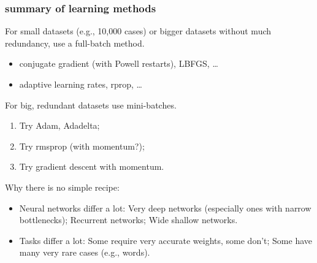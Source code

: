 \documentclass[USenglish,pdftex,compress,10pt,svgnamesi,handout]{beamer}
\begin{document}
\begin{frame}
\frametitle{summary of learning methods}
For small datasets (e.g., 10,000 cases) or bigger datasets without much redundancy,
use a full-batch method.
\begin{itemize}
\item conjugate gradient (with Powell restarts), LBFGS, \dots
\item adaptive learning rates, rprop, \dots
\end{itemize}
 For big, redundant datasets use mini-batches.
\begin{enumerate}
\item Try Adam, Adadelta;
\item Try rmsprop (with momentum?);
\item Try gradient descent with momentum.
\end{enumerate}
Why there is no simple recipe:
\begin{itemize}
\item Neural networks differ a lot:  Very deep networks (especially ones with narrow bottlenecks);
  Recurrent networks;  Wide shallow networks. 
\item Tasks differ a lot:
  Some require very accurate weights, some don't;
  Some have many very rare cases (e.g., words).
  \end{itemize}
  \end{frame}
\end{document}
